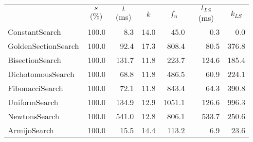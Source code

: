 \begin{center}
\label{tab:performance_results_NegativeEntropy}
\begin{tabular}{|l|r|r|r|r|r|r|}
\hline
\rowcolor{gray!25}
\multicolumn{1}{|c|}{Line Search Name} & \multicolumn{1}{c|}{$s$ (\%)} & \multicolumn{1}{c|}{$t$ (ms)} & \multicolumn{1}{c|}{$k$} & \multicolumn{1}{c|}{$f_n$} & \multicolumn{1}{c|}{$t_{LS}$ (ms)} & \multicolumn{1}{c|}{$k_{LS}$} \\
ConstantSearch & 100.0 & 8.3 & 14.0 & 45.0 & 0.3 & 0.0 \\
GoldenSectionSearch & 100.0 & 92.4 & 17.3 & 808.4 & 80.5 & 376.8 \\
BisectionSearch & 100.0 & 131.7 & 11.8 & 223.7 & 124.6 & 185.4 \\
DichotomousSearch & 100.0 & 68.8 & 11.8 & 486.5 & 60.9 & 224.1 \\
FibonacciSearch & 100.0 & 72.1 & 11.8 & 843.4 & 64.3 & 390.8 \\
UniformSearch & 100.0 & 134.9 & 12.9 & 1051.1 & 126.6 & 996.3 \\
NewtonsSearch & 100.0 & 541.0 & 12.8 & 806.1 & 533.7 & 250.6 \\
ArmijoSearch & 100.0 & 15.5 & 14.4 & 113.2 & 6.9 & 23.6 \\

\hline
\end{tabular}
\end{center}
